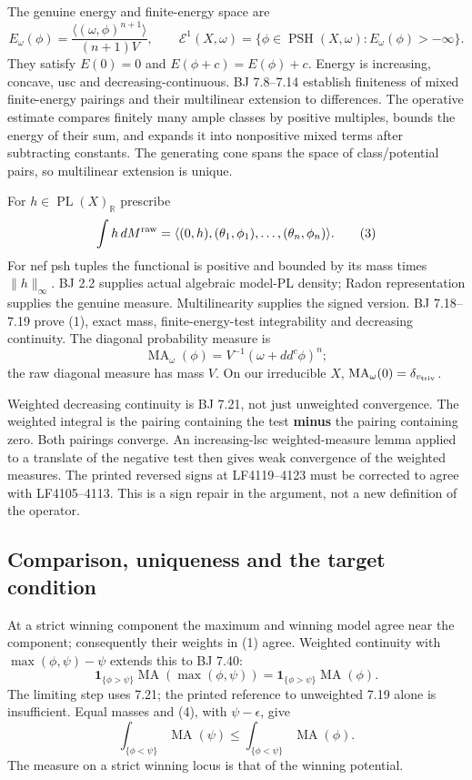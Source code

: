 \documentclass[
  11pt,
]{article}
\begin{document}
The genuine energy and finite-energy space are \[
 E_\omega(\phi)=\frac{\langle(\omega,\phi)^{n+1}\rangle}{(n+1)V},
 \qquad \mathcal E^1(X,\omega)=\{\phi\in\operatorname{PSH}(X,\omega):
                                      E_\omega(\phi)>-\infty\}.
 \tag{2}
\] They satisfy \(E(0)=0\) and \(E(\phi+c)=E(\phi)+c\). Energy is
increasing, concave, usc and decreasing-continuous. BJ 7.8--7.14
establish finiteness of mixed finite-energy pairings and their
multilinear extension to differences. The operative estimate compares
finitely many ample classes by positive multiples, bounds the energy of
their sum, and expands it into nonpositive mixed terms after subtracting
constants. The generating cone spans the space of class/potential pairs,
so multilinear extension is unique.

For \(h\in\operatorname{PL}(X)_{\mathbb R}\) prescribe \[
 \int h\,dM^{\rm raw}=
 \langle(0,h),(\theta_1,\phi_1),\ldots,(\theta_n,\phi_n)\rangle.
 \tag{3}
\] For nef psh tuples the functional is positive and bounded by its mass
times \(\|h\|_\infty\). BJ 2.2 supplies actual algebraic model-PL
density; Radon representation supplies the genuine measure.
Multilinearity supplies the signed version. BJ 7.18--7.19 prove (1),
exact mass, finite-energy-test integrability and decreasing continuity.
The diagonal probability measure is
\[\operatorname{MA}_\omega(\phi)=V^{-1}(\omega+dd^c\phi)^n;\] the raw
diagonal measure has mass \(V\). On our irreducible \(X\),
\(\operatorname{MA}_\omega(0)=\delta_{v_{\rm triv}}\).

Weighted decreasing continuity is BJ 7.21, not just unweighted
convergence. The weighted integral is the pairing containing the test
\textbf{minus} the pairing containing zero. Both pairings converge. An
increasing-lsc weighted-measure lemma applied to a translate of the
negative test then gives weak convergence of the weighted measures. The
printed reversed signs at LF4119--4123 must be corrected to agree with
LF4105--4113. This is a sign repair in the argument, not a new
definition of the operator.

\subsection{Comparison, uniqueness and the target
condition}\label{comparison-uniqueness-and-the-target-condition}

At a strict winning component the maximum and winning model agree near
the component; consequently their weights in (1) agree. Weighted
continuity with \(\max(\phi,\psi)-\psi\) extends this to BJ 7.40: \[
 \mathbf1_{\{\phi>\psi\}}\operatorname{MA}(\max(\phi,\psi))
 =\mathbf1_{\{\phi>\psi\}}\operatorname{MA}(\phi).
 \tag{4}
\] The limiting step uses 7.21; the printed reference to unweighted 7.19
alone is insufficient. Equal masses and (4), with \(\psi-\epsilon\),
give \[
 \int_{\{\phi<\psi\}}\operatorname{MA}(\psi)
 \le\int_{\{\phi<\psi\}}\operatorname{MA}(\phi).
 \tag{5}
\] The measure on a strict winning locus is that of the winning
potential.
\end{document}
